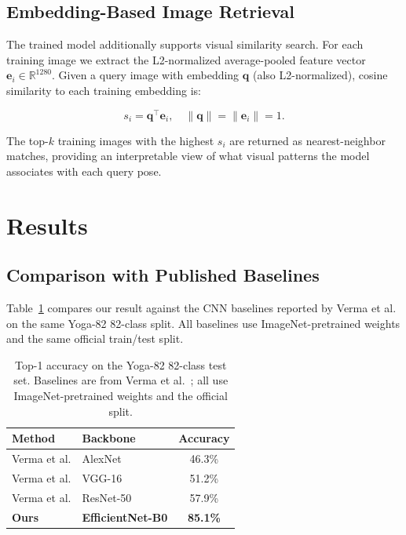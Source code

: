 \documentclass[conference]{IEEEtran}
\begin{document}
\subsection{Embedding-Based Image Retrieval}

The trained model additionally supports visual similarity search. For each training image we extract the L2-normalized average-pooled feature vector $\mathbf{e}_i \in \mathbb{R}^{1280}$. Given a query image with embedding $\mathbf{q}$ (also L2-normalized), cosine similarity to each training embedding is:

\begin{equation}
s_i = \mathbf{q}^{\!\top} \mathbf{e}_i, \quad \|\mathbf{q}\| = \|\mathbf{e}_i\| = 1.
\label{eq:cosine_sim}
\end{equation}

The top-$k$ training images with the highest $s_i$ are returned as nearest-neighbor matches, providing an interpretable view of what visual patterns the model associates with each query pose.


\section{Results}

\subsection{Comparison with Published Baselines}

Table~\ref{tab:comparison} compares our result against the CNN baselines reported by Verma et al.~\cite{verma2020yoga} on the same Yoga-82 82-class split. All baselines use ImageNet-pretrained weights and the same official train/test split.

\begin{table}[htbp]
\caption{Top-1 accuracy on the Yoga-82 82-class test set. Baselines are from Verma et al.~\cite{verma2020yoga}; all use ImageNet-pretrained weights and the official split.}
\begin{center}
\begin{tabular}{|l|l|c|}
\hline
\textbf{Method} & \textbf{Backbone} & \textbf{Accuracy} \\
\hline
Verma et al. & AlexNet    & 46.3\% \\
Verma et al. & VGG-16     & 51.2\% \\
Verma et al. & ResNet-50  & 57.9\% \\
\hline
\textbf{Ours} & \textbf{EfficientNet-B0} & \textbf{85.1\%} \\
\hline
\end{tabular}
\label{tab:comparison}
\end{center}
\end{table}
\end{document}

